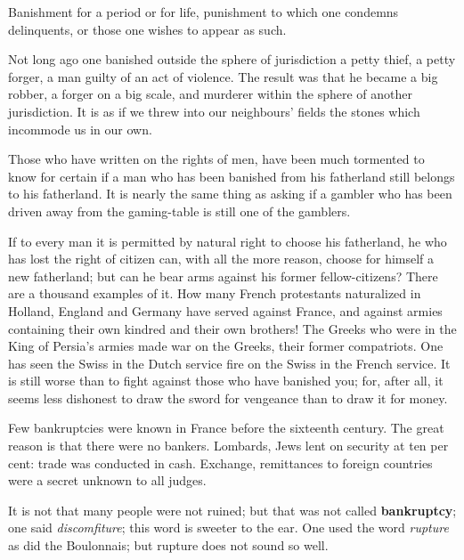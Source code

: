 


Banishment for a period or for life, punishment to which one condemns
delinquents, or those one wishes to appear as such.

Not long ago one banished outside the sphere of jurisdiction a petty
thief, a petty forger, a man guilty of an act of violence. The result
was that he became a big robber, a forger on a big scale, and murderer
within the sphere of another jurisdiction. It is as if we threw into our
neighbours' fields the stones which incommode us in our own.

Those who have written on the rights of men, have been much tormented to
know for certain if a man who has been banished from his fatherland
still belongs to his fatherland. It is nearly the same thing as asking
if a gambler who has been driven away from the gaming-table is still one
of the gamblers.

If to every man it is permitted by natural right to choose his
fatherland, he who has lost the right of citizen can, with all the more
reason, choose for himself a new fatherland; but can he bear arms
against his former fellow-citizens? There are a thousand examples of it.
How many French protestants naturalized in Holland, England and Germany
have served against France, and against armies containing their own
kindred and their own brothers! The Greeks who were in the King of
Persia's armies made war on the Greeks, their former compatriots. One
has seen the Swiss in the Dutch service fire on the Swiss in the French
service. It is still worse than to fight against those who have banished
you; for, after all, it seems less dishonest to draw the sword for
vengeance than to draw it for money.






Few bankruptcies were known in France before the sixteenth century. The
great reason is that there were no bankers. Lombards, Jews lent on
security at ten per cent: trade was conducted in cash. Exchange,
remittances to foreign countries were a secret unknown to all judges.

It is not that many people were not ruined; but that was not called
\textbf{bankruptcy}; one said \textit{discomfiture}; this word is sweeter to the ear.
One used the word \textit{rupture} as did the Boulonnais; but rupture does not
sound so well.

